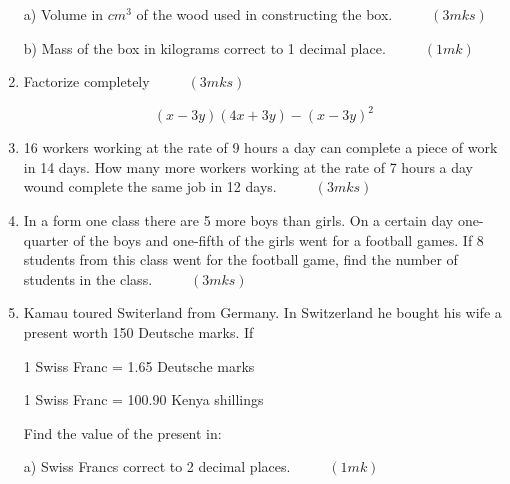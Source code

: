 \documentclass[
  a4paperpaper,
]{scrbook}
\begin{document}
\begin{tcolorbox}
\begin{enumerate}
  a) Volume in \(cm^3\) of the wood used in constructing the box.
  \(\hspace{1cm} (3mks)\)

  b) Mass of the box in kilograms correct to 1 decimal place.
  \(\hspace{1cm} (1mk)\)
\item
  Factorize completely \(\hspace{1cm} (3mks)\)

  \[(x-3y)(4x+3y)-(x-3y)^2\]
\item
  16 workers working at the rate of 9 hours a day can complete a piece
  of work in 14 days. How many more workers working at the rate of 7
  hours a day wound complete the same job in 12 days.
  \(\hspace{1cm} (3mks)\)
\item
  In a form one class there are 5 more boys than girls. On a certain day
  one-quarter of the boys and one-fifth of the girls went for a football
  games. If 8 students from this class went for the football game, find
  the number of students in the class. \(\hspace{1cm}(3mks)\)
\item
  Kamau toured Switerland from Germany. In Switzerland he bought his
  wife a present worth 150 Deutsche marks. If

  1 Swiss Franc = 1.65 Deutsche marks

  1 Swiss Franc = 100.90 Kenya shillings

  Find the value of the present in:

  a) Swiss Francs correct to 2 decimal places. \(\hspace{1cm} (1mk)\)


\end{enumerate}
\end{tcolorbox}
\end{document}
